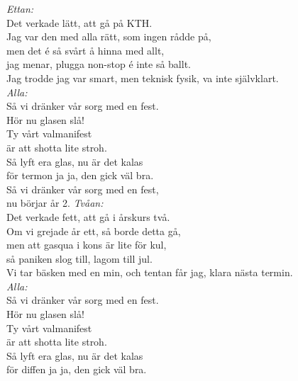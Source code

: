 \documentclass[a6paper, 10pt, twoside]{article}
\begin{document}
\begin{center}
\end{center}
\begin{lyrics}
\textit{Ettan:} \\
Det verkade lätt, att gå på KTH. \\
Jag var den med alla rätt, som ingen rådde på, \\
men det é så svårt å hinna med allt, \\
jag menar, plugga non-stop é inte så ballt. \\
Jag trodde jag var smart, \physicalonly{\\}men teknisk fysik, va inte självklart.
\vspace{5pt} \\
\textit{Alla:} \\
Så vi dränker vår sorg med en fest. \\
Hör nu glasen slå! \\
Ty vårt valmanifest \\
är att shotta lite stroh. \\
Så lyft era glas, nu är det kalas \\
för termon ja ja, den gick väl bra. \\
Så vi dränker vår sorg med en fest, \\
nu börjar år 2.
\newpage
\noindent
\textit{Tvåan:} \\
Det verkade fett, att gå i årskurs två. \\
Om vi grejade år ett, så borde detta gå, \\
men att gasqua i kons är lite för kul, \\
så paniken slog till, lagom till jul. \\
Vi tar bäsken med en min, \physicalonly{\\}och tentan får jag, klara nästa termin.
\vspace{5pt} \\
\textit{Alla:} \\
Så vi dränker vår sorg med en fest. \\
Hör nu glasen slå! \\
Ty vårt valmanifest \\
är att shotta lite stroh. \\
Så lyft era glas, nu är det kalas \\
för diffen ja ja, den gick väl bra. \\

\end{lyrics}
\end{document}
